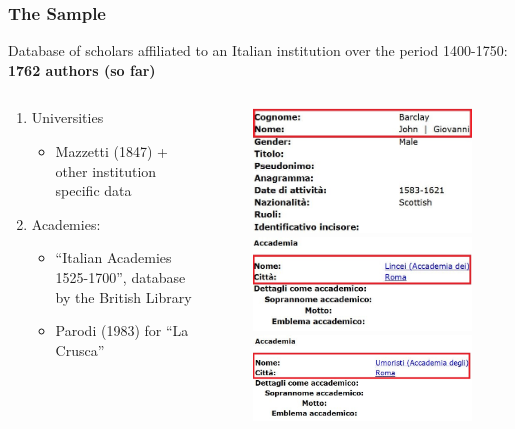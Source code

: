 \documentclass[aspectratio=169,red,12pt]{beamer}
\begin{document}
\begin{frame}
	\frametitle{The Sample}
	Database of scholars affiliated to an Italian institution over the period 1400-1750:  \textbf{1762 authors (so far)} \vspace{0.3cm}
	\begin{columns}
		\begin{column}[t]{0.49\textwidth}
			\begin{enumerate}
				\item Universities 
				\begin{itemize}
					\item Mazzetti (1847) + other institution specific data\vspace{0.3cm}
				\end{itemize}
				\item Academies: 
				\begin{itemize}
					\item “Italian Academies 1525-1700”, database by the British Library 
					\item Parodi (1983) for “La Crusca”\vspace{0.1cm}
				\end{itemize}
			\end{enumerate}
			
			
		\end{column}
		
		\begin{column}[t]{0.48\textwidth}
			\vspace{-0.5cm}	
			\begin{figure}[p]
				\includegraphics[width=0.6\linewidth]{database1}\\	
				\includegraphics[width=0.6\linewidth]{database2}\\
				\includegraphics[width=0.6\linewidth]{database3}
			\end{figure}
		\end{column}		
		
		
	\end{columns}
	
	
	
\end{frame}
\end{document}
